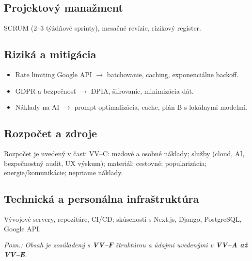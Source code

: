 \documentclass[11pt,a4paper]{article}
\begin{document}
\subsection{Projektový manažment}
SCRUM (2–3 týždňové sprinty), mesačné revízie, rizikový register.

\subsection{Riziká a mitigácia}
\begin{itemize}
\item Rate limiting Google API $\rightarrow$ batchovanie, caching, exponenciálne backoff.
\item GDPR a bezpečnosť $\rightarrow$ DPIA, šifrovanie, minimizácia dát.
\item Náklady na AI $\rightarrow$ prompt optimalizácia, cache, plán B s lokálnymi modelmi.
\end{itemize}

\subsection{Rozpočet a zdroje}
Rozpočet je uvedený v časti VV–C: mzdové a osobné náklady; služby (cloud, AI, bezpečnostný audit, UX výskum); materiál; cestovné; popularizácia; energie/komunikácie; nepriame náklady.

\subsection{Technická a personálna infraštruktúra}
Vývojové servery, repozitáre, CI/CD; skúsenosti s Next.js, Django, PostgreSQL, Google API.

\vfill
\noindent\textit{Pozn.: Obsah je zosúladený s \textbf{VV–F} štruktúrou a údajmi uvedenými v \textbf{VV–A až VV–E}.}
\end{document}
